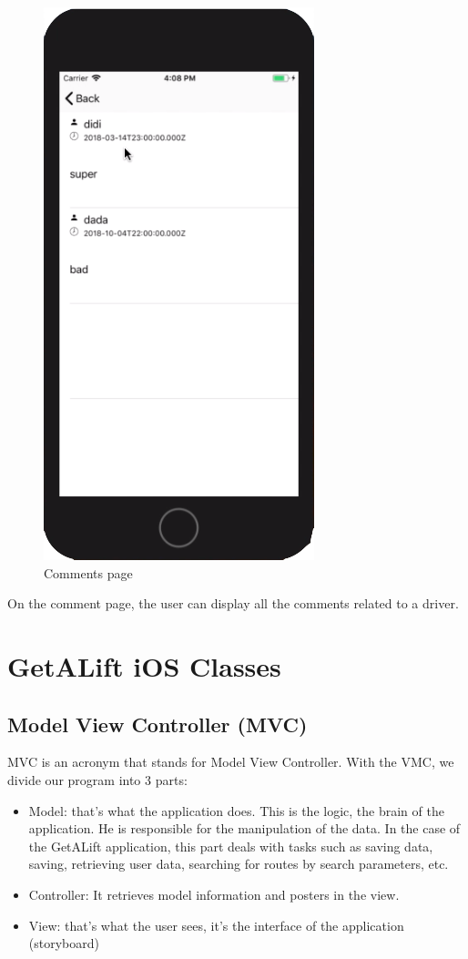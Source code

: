 \begin{figure}[h!]
\begin{center}
\includegraphics[scale = 0.3]{diagrams/Comments} 
\end{center}
\caption{Comments page}
\end{figure}

On the comment page, the user can display all the comments related to a driver.



\section{GetALift iOS Classes}

\subsection{Model View Controller (MVC)}

MVC is an acronym that stands for Model View Controller. With the VMC, we divide our program into 3 parts:
\begin{itemize}
\item Model: that's what the application does. This is the logic, the brain of the application. He is responsible for the manipulation of the data. In the case of the GetALift application, this part deals with tasks such as saving data, saving, retrieving user data, searching for routes by search parameters, etc.
\item Controller: It retrieves model information and posters in the view.
\item View: that's what the user sees, it's the interface of the application (storyboard)
\end{itemize}

